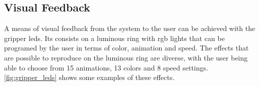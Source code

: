 \subsection{Visual Feedback}


\par A means of visual feedback from the system to the user can be achieved with the gripper \acp{led}. Its consists on a luminous ring with \ac{rgb} lights that can be programed by the user in terms of color, animation and speed. The effects that are possible to reproduce on the luminous ring are diverse, with the user being able to choose from 15 animations, 13 colors and 8 speed settings. \autoref{fig:gripper_leds} shows some examples of these effects.

